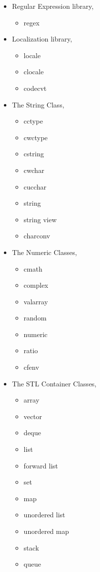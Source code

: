 \documentclass[12pt]{article}
\begin{document}
\begin{enumerate}
\begin{itemize}
	\item Regular Expression library,
		\begin{itemize}
		\item regex
		\end{itemize}
		
	\item Localization library,
		\begin{itemize}
		\item locale
		\item clocale
		\item codecvt
		\end{itemize}
		
	\item The String Class,
		\begin{itemize}
		\item cctype
		\item cwctype
		\item cstring
		\item cwchar
		\item cucchar
		\item string
		\item string view
		\item charconv
		\end{itemize}
		
	\item The Numeric Classes,
		\begin{itemize}
		\item cmath
		\item complex
		\item valarray
		\item random
		\item numeric
		\item ratio
		\item cfenv
		\end{itemize}
		
	\item The STL Container Classes,
		\begin{itemize}
		\item array
		\item vector
		\item deque
		\item list
		\item forward list
		\item set
		\item map
		\item unordered list
		\item unordered map
		\item  stack
		\item  queue
		\end{itemize}
		

\end{itemize}
\end{enumerate}
\end{document}
